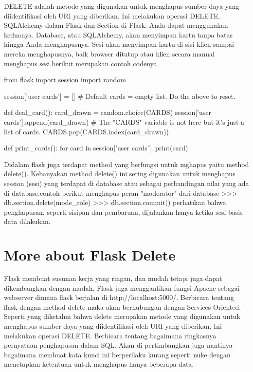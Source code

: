 DELETE adalah metode yang digunakan untuk menghapus sumber daya yang diidentifikasi oleh URI yang diberikan. Ini melakukan operasi DELETE\cite{alemu2014rest}.
SQLAlchemy dalam Flask dan Section di Flask. Anda dapat menggunakan keduanya. Database, atau SQLAlchemy, akan menyimpan kartu tanpa batas hingga Anda menghapusnya. Sesi akan menyimpan kartu di sisi klien sampai mereka menghapusnya, baik browser ditutup atau klien secara manual menghapus sesi.berikut merupakan contoh codenya.

from flask import session
import random

session['user cards'] = []
# Default cards = empty list. Do the above to reset.

def deal_card():
  card_drawn = random.choice(CARDS)
  session['user cards'].append(card_drawn)
  # The "CARDS" variable is not here but it's just a list of cards.
  CARDS.pop(CARDS.index(card_drawn))

def print_cards():
  for card in session['user cards']:
    print(card)

Didalam flask juga terdapat method yang berfungsi untuk mghapus yaitu method delete(). Kebanyakan method delete() ini sering digunakan untuk menghapus session (sesi) yang terdapat di database atau sebagai perbandingan nilai yang ada di database.contoh berikut menghapus peran "moderator" dari database
>>> db.section.delete(mode_role)
>>> db.section.commit()
perhatikan bahwa penghapusan. seperti sisipan dan pembaruan, dijalankan hanya ketika sesi basis data dilakukan\cite{grinberg2018flask}.



\section{More about Flask Delete}
Flask membuat susunan kerja yang ringan, dan mudah tetapi juga dapat dikembangkan dengan mudah. Flask juga menggantikan fungsi Apache sebagai webserver dimana flask berjalan di http://localhost:5000/.  Berbicara tentang flask dengan method delete maka akan berhubungan dengan Services Oriented. Seperti yang diketahui bahwa delete merupakan metode yang digunakan untuk menghapus sumber daya yang diidentifikasi oleh URI yang diberikan. Ini melakukan operasi DELETE. Berbicara tentang bagaimana ringkasnya pernyataan penghapusan dalam SQL. Akan di pertimbangkan juga nantinya bagaimana membuat kata kunci ini berperilaku kurang seperti nuke dengan menetapkan ketentuan untuk menghapus hanya beberapa data\cite{dwyer2016flask}.

